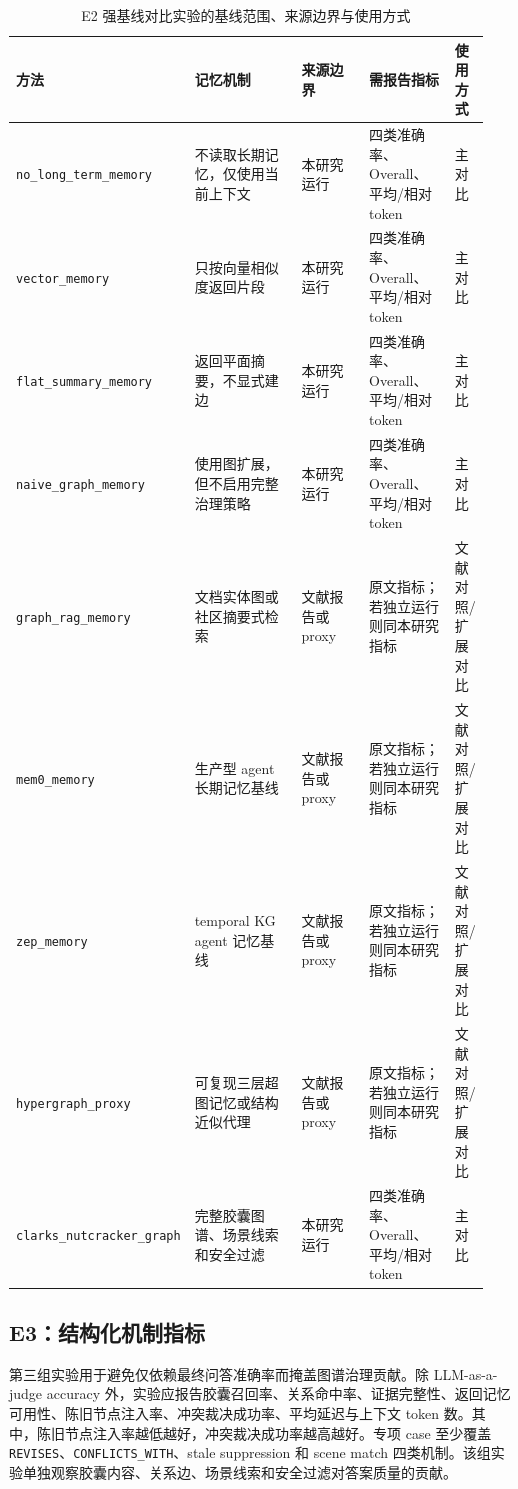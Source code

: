 \documentclass[a4paper,fleqn]{cas-sc}
\begin{document}
\begin{CJK*}{UTF8}{gbsn}
\begin{table}[t]
\centering
\scriptsize
\caption{E2 强基线对比实验的基线范围、来源边界与使用方式}
\label{tab:e2-baselines}
\setlength{\tabcolsep}{2pt}
\begin{tabular}{P{0.22\linewidth}P{0.28\linewidth}P{0.17\linewidth}P{0.20\linewidth}P{0.07\linewidth}}
\toprule
方法 & 记忆机制 & 来源边界 & 需报告指标 & 使用方式 \\
\midrule
\texttt{no\_long\_term\_memory} & 不读取长期记忆，仅使用当前上下文 & 本研究运行 & 四类准确率、Overall、平均/相对 token & 主对比 \\
\texttt{vector\_memory} & 只按向量相似度返回片段 & 本研究运行 & 四类准确率、Overall、平均/相对 token & 主对比 \\
\texttt{flat\_summary\_memory} & 返回平面摘要，不显式建边 & 本研究运行 & 四类准确率、Overall、平均/相对 token & 主对比 \\
\texttt{naive\_graph\_memory} & 使用图扩展，但不启用完整治理策略 & 本研究运行 & 四类准确率、Overall、平均/相对 token & 主对比 \\
\texttt{graph\_rag\_memory} & 文档实体图或社区摘要式检索 & 文献报告或 proxy & 原文指标；若独立运行则同本研究指标 & 文献对照/扩展对比 \\
\texttt{mem0\_memory} & 生产型 agent 长期记忆基线 & 文献报告或 proxy & 原文指标；若独立运行则同本研究指标 & 文献对照/扩展对比 \\
\texttt{zep\_memory} & temporal KG agent 记忆基线 & 文献报告或 proxy & 原文指标；若独立运行则同本研究指标 & 文献对照/扩展对比 \\
\texttt{hypergraph\_proxy} & 可复现三层超图记忆或结构近似代理 & 文献报告或 proxy & 原文指标；若独立运行则同本研究指标 & 文献对照/扩展对比 \\
\texttt{clarks\_nutcracker\_graph} & 完整胶囊图谱、场景线索和安全过滤 & 本研究运行 & 四类准确率、Overall、平均/相对 token & 主对比 \\
\bottomrule
\end{tabular}
\end{table}

\subsection{E3：结构化机制指标}

第三组实验用于避免仅依赖最终问答准确率而掩盖图谱治理贡献。除 LLM-as-a-judge accuracy 外，实验应报告胶囊召回率、关系命中率、证据完整性、返回记忆可用性、陈旧节点注入率、冲突裁决成功率、平均延迟与上下文 token 数。其中，陈旧节点注入率越低越好，冲突裁决成功率越高越好。专项 case 至少覆盖 \texttt{REVISES}、\texttt{CONFLICTS\_WITH}、stale suppression 和 scene match 四类机制。该组实验单独观察胶囊内容、关系边、场景线索和安全过滤对答案质量的贡献。


\end{CJK*}
\end{document}
